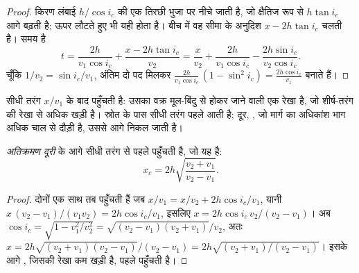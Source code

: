 \begin{proof}
किरण लंबाई $h/\cos i_c$ की एक तिरछी भुजा पर नीचे जाती है, जो
क्षैतिज रूप से $h\tan i_c$ आगे बढ़ती है; ऊपर लौटते हुए भी यही होता है। बीच में वह
सीमा के अनुदिश $x - 2h\tan i_c$ चलती है। समय है
\[
  t = \frac{2h}{v_1\cos i_c} + \frac{x - 2h\tan i_c}{v_2}
    = \frac{x}{v_2} + \frac{2h}{v_1\cos i_c} - \frac{2h\sin i_c}{v_2\cos i_c}.
\]
चूँकि $1/v_2 = \sin i_c/v_1$, अंतिम दो पद मिलकर
$\frac{2h}{v_1\cos i_c}\,(1 - \sin^2 i_c) = \frac{2h\cos i_c}{v_1}$ बनाते हैं।
\end{proof}

सीधी तरंग $x/v_1$ के बाद पहुँचती है: उसका वक्र मूल-बिंदु से होकर जाने वाली
एक रेखा है, जो शीर्ष-तरंग की रेखा से अधिक खड़ी है। स्रोत के पास सीधी तरंग
पहले आती है; दूर, , जो मार्ग का अधिकांश भाग अधिक चाल से
दौड़ी है, उससे आगे निकल जाती है।

\begin{proposition}[अतिक्रमण दूरी]\label{prop:g11:seismic-structure:crossover}
 \emph{अतिक्रमण
दूरी} के आगे सीधी तरंग से पहले पहुँचती है, जो यह है:
\[
  x_c = 2h\sqrt{\frac{v_2 + v_1}{v_2 - v_1}}.
\]
\end{proposition}

\begin{proof}
दोनों एक साथ तब पहुँचती हैं जब $x/v_1 = x/v_2 + 2h\cos i_c/v_1$, यानी
$x\,(v_2 - v_1)/(v_1 v_2) = 2h\cos i_c/v_1$, इसलिए $x = 2h\cos i_c\,v_2/(v_2 -
v_1)$। अब $\cos i_c = \sqrt{1 - v_1^2/v_2^2} = \sqrt{(v_2 - v_1)(v_2 +
v_1)}/v_2$, अतः $x = 2h\sqrt{(v_2 + v_1)(v_2 - v_1)}/(v_2 - v_1) =
2h\sqrt{(v_2 + v_1)/(v_2 - v_1)}$। इसके आगे , जिसकी रेखा
कम खड़ी है, पहले पहुँचती है।
\end{proof}

